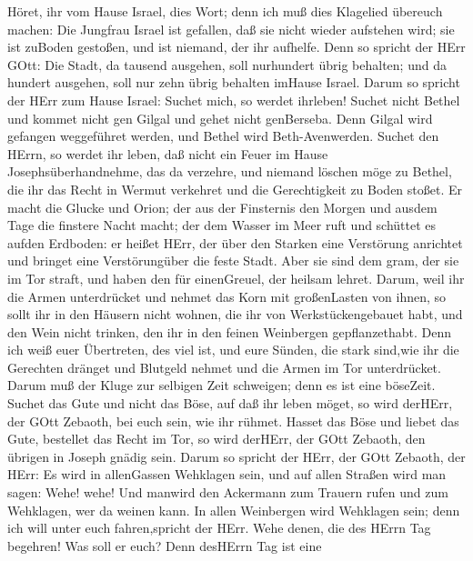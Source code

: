  Höret, ihr vom Hause Israel, dies Wort; denn ich muß dies
Klagelied übereuch machen:  Die Jungfrau Israel ist
gefallen, daß sie nicht wieder aufstehen wird; sie ist zuBoden gestoßen,
und ist niemand, der ihr aufhelfe.  Denn so spricht der HErr
GOtt: Die Stadt, da tausend ausgehen, soll nurhundert übrig behalten;
und da hundert ausgehen, soll nur zehn übrig behalten imHause Israel.
 Darum so spricht der HErr zum Hause Israel: Suchet mich, so
werdet ihrleben!  Suchet nicht Bethel und kommet nicht gen
Gilgal und gehet nicht genBerseba. Denn Gilgal wird gefangen weggeführet
werden, und Bethel wird Beth-Avenwerden.  Suchet den HErrn,
so werdet ihr leben, daß nicht ein Feuer im Hause Josephsüberhandnehme,
das da verzehre, und niemand löschen möge zu Bethel,  die
ihr das Recht in Wermut verkehret und die Gerechtigkeit zu Boden stoßet.
 Er macht die Glucke und Orion; der aus der Finsternis den
Morgen und ausdem Tage die finstere Nacht macht; der dem Wasser im Meer
ruft und schüttet es aufden Erdboden: er heißet HErr,  der
über den Starken eine Verstörung anrichtet und bringet eine
Verstörungüber die feste Stadt.  Aber sie sind dem gram,
der sie im Tor straft, und haben den für einenGreuel, der heilsam
lehret.  Darum, weil ihr die Armen unterdrücket und nehmet
das Korn mit großenLasten von ihnen, so sollt ihr in den Häusern nicht
wohnen, die ihr von Werkstückengebauet habt, und den Wein nicht trinken,
den ihr in den feinen Weinbergen gepflanzethabt.  Denn ich
weiß euer Übertreten, des viel ist, und eure Sünden, die stark sind,wie
ihr die Gerechten dränget und Blutgeld nehmet und die Armen im Tor
unterdrücket.  Darum muß der Kluge zur selbigen Zeit
schweigen; denn es ist eine böseZeit.  Suchet das Gute und
nicht das Böse, auf daß ihr leben möget, so wird derHErr, der GOtt
Zebaoth, bei euch sein, wie ihr rühmet.  Hasset das Böse
und liebet das Gute, bestellet das Recht im Tor, so wird derHErr, der
GOtt Zebaoth, den übrigen in Joseph gnädig sein.  Darum so
spricht der HErr, der GOtt Zebaoth, der HErr: Es wird in allenGassen
Wehklagen sein, und auf allen Straßen wird man sagen: Wehe! wehe! Und
manwird den Ackermann zum Trauern rufen und zum Wehklagen, wer da weinen
kann.  In allen Weinbergen wird Wehklagen sein; denn ich
will unter euch fahren,spricht der HErr.  Wehe denen, die
des HErrn Tag begehren! Was soll er euch? Denn desHErrn Tag ist eine
